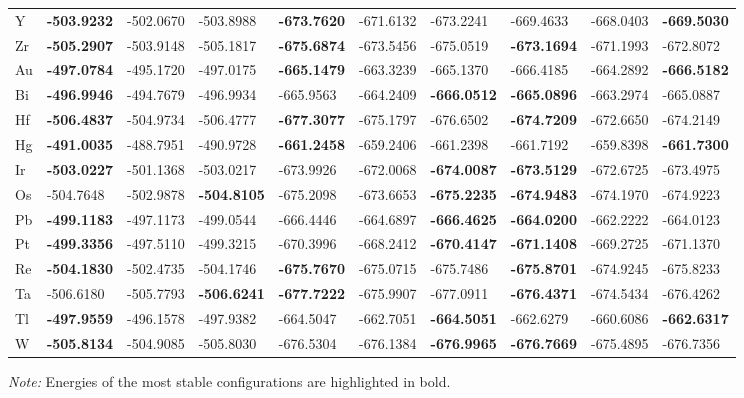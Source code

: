 \begin{table}[htbp]
{\begin{tabular}{l *{9}{l}}
      Y  & \textbf{-503.9232} & -502.0670 & -503.8988 & \textbf{-673.7620} & -671.6132 & -673.2241 & -669.4633 & -668.0403 & \textbf{-669.5030} \\
      Zr & \textbf{-505.2907} & -503.9148 & -505.1817 & \textbf{-675.6874} & -673.5456 & -675.0519 & \textbf{-673.1694} & -671.1993 & -672.8072 \\
      Au & \textbf{-497.0784} & -495.1720 & -497.0175 & \textbf{-665.1479} & -663.3239 & -665.1370 & -666.4185 & -664.2892 & \textbf{-666.5182} \\
      Bi & \textbf{-496.9946} & -494.7679 & -496.9934 & -665.9563 & -664.2409 & \textbf{-666.0512} & \textbf{-665.0896} & -663.2974 & -665.0887 \\
      Hf & \textbf{-506.4837} & -504.9734 & -506.4777 & \textbf{-677.3077} & -675.1797 & -676.6502 & \textbf{-674.7209} & -672.6650 & -674.2149 \\
      Hg & \textbf{-491.0035} & -488.7951 & -490.9728 & \textbf{-661.2458} & -659.2406 & -661.2398 & -661.7192 & -659.8398 & \textbf{-661.7300} \\
      Ir & \textbf{-503.0227} & -501.1368 & -503.0217 & -673.9926 & -672.0068 & \textbf{-674.0087} & \textbf{-673.5129} & -672.6725 & -673.4975 \\
      Os & -504.7648 & -502.9878 & \textbf{-504.8105} & -675.2098 & -673.6653 & \textbf{-675.2235} & \textbf{-674.9483} & -674.1970 & -674.9223 \\
      Pb & \textbf{-499.1183} & -497.1173 & -499.0544 & -666.4446 & -664.6897 & \textbf{-666.4625} & \textbf{-664.0200} & -662.2222 & -664.0123 \\
      Pt & \textbf{-499.3356} & -497.5110 & -499.3215 & -670.3996 & -668.2412 & \textbf{-670.4147} & \textbf{-671.1408} & -669.2725 & -671.1370 \\
      Re & \textbf{-504.1830} & -502.4735 & -504.1746 & \textbf{-675.7670} & -675.0715 & -675.7486 & \textbf{-675.8701} & -674.9245 & -675.8233 \\
      Ta & -506.6180 & -505.7793 & \textbf{-506.6241} & \textbf{-677.7222} & -675.9907 & -677.0911 & \textbf{-676.4371} & -674.5434 & -676.4262 \\
      Tl & \textbf{-497.9559} & -496.1578 & -497.9382 & -664.5047 & -662.7051 & \textbf{-664.5051} & -662.6279 & -660.6086 & \textbf{-662.6317}\\
      W  & \textbf{-505.8134} & -504.9085 & -505.8030 & -676.5304 & -676.1384 & \textbf{-676.9965} & \textbf{-676.7669} & -675.4895 & -676.7356 \\
      \bottomrule
    \end{tabular}
  }

  \smallskip

  \footnotesize\textit{Note:} Energies of the most stable configurations are highlighted in bold.
\end{table}

